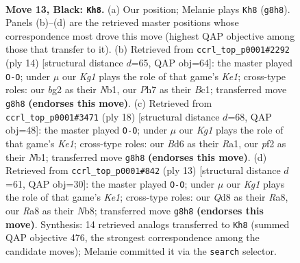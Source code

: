 \documentclass[11pt]{article}
\begin{document}
\clearpage

\begin{figure}[p]\centering
\begin{subfigure}{0.46\textwidth}\centering
\resizebox{\linewidth}{!}{%
\newchessgame
\chessboard[
  setfen={rnbqr1k1/p5pp/2pb1n2/1p1p1p2/3P4/4BNP1/PPQ1PPBP/RN3RK1 b - - 7 13},
  showmover=false,
  pgfstyle=straightmove, color=movearrow, markmove={g8-h8}
]}
\caption{}
\end{subfigure}\hfill
\begin{subfigure}{0.46\textwidth}\centering
\resizebox{\linewidth}{!}{%
\newchessgame
\chessboard[
  setfen={rnb1kb1r/ppq2ppp/4pn2/3p4/3P4/1PPB1N2/P4PPP/RNBQK2R w KQkq - 1 8},
  showmover=false,
  pgfstyle=straightmove, color=movearrow, markmove={e1-g1}
]}
\caption{}
\end{subfigure}
\\[4pt]
\begin{subfigure}{0.46\textwidth}\centering
\resizebox{\linewidth}{!}{%
\newchessgame
\chessboard[
  setfen={1nbqkb1r/1p3ppp/r3pn2/p7/1pPP4/P4NP1/5PBP/RNBQK2R w KQk - 2 10},
  showmover=false,
  pgfstyle=straightmove, color=movearrow, markmove={e1-g1}
]}
\caption{}
\end{subfigure}\hfill
\begin{subfigure}{0.46\textwidth}\centering
\resizebox{\linewidth}{!}{%
\newchessgame
\chessboard[
  setfen={rnbqk2r/pp2bppp/2p2n2/3p4/2PQ4/5NP1/PP2PPBP/RNB2RK1 b kq - 3 7},
  showmover=false,
  pgfstyle=straightmove, color=movearrow, markmove={e8-g8}
]}
\caption{}
\end{subfigure}
\caption{\textbf{Move 13, Black: \texttt{Kh8}.} (a) Our position; Melanie plays \texttt{Kh8} (\texttt{g8h8}). Panels (b)--(d) are the retrieved master positions whose correspondence most drove this move (highest QAP objective among those that transfer to it). (b) Retrieved from \texttt{ccrl\_top\_p0001\#2292} (ply 14) [structural distance $d$=65, QAP obj=64]: the master played \texttt{O-O}; under $\mu$ our \emph{Kg1} plays the role of that game's \emph{Ke1}; cross-type roles: our \emph{b}g2 as their \emph{N}b1, our \emph{P}h7 as their \emph{B}c1; transferred move \texttt{g8h8} \textbf{(endorses this move)}. (c) Retrieved from \texttt{ccrl\_top\_p0001\#3471} (ply 18) [structural distance $d$=68, QAP obj=48]: the master played \texttt{O-O}; under $\mu$ our \emph{Kg1} plays the role of that game's \emph{Ke1}; cross-type roles: our \emph{B}d6 as their \emph{R}a1, our \emph{p}f2 as their \emph{N}b1; transferred move \texttt{g8h8} \textbf{(endorses this move)}. (d) Retrieved from \texttt{ccrl\_top\_p0001\#842} (ply 13) [structural distance $d$=61, QAP obj=30]: the master played \texttt{O-O}; under $\mu$ our \emph{Kg1} plays the role of that game's \emph{Ke1}; cross-type roles: our \emph{Q}d8 as their \emph{R}a8, our \emph{R}a8 as their \emph{N}b8; transferred move \texttt{g8h8} \textbf{(endorses this move)}. Synthesis: 14 retrieved analogs transferred to \texttt{Kh8} (summed QAP objective 476, the strongest correspondence among the candidate moves); Melanie committed it via the \texttt{search} selector.}
\label{fig:thought-m25}
\end{figure}
\end{document}
